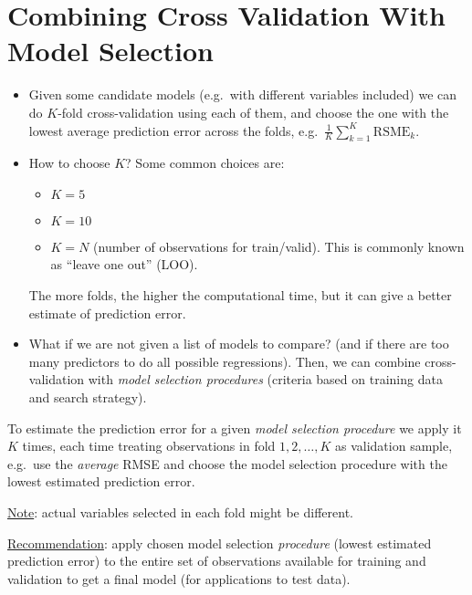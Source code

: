 \section{Combining Cross Validation With Model Selection}
\begin{itemize}
      \item Given some candidate models (e.g.\ with different
            variables included) we can do $ K $-fold
            cross-validation using each of them, and choose the one
            with the lowest average prediction error across
            the folds, e.g.\ $ \displaystyle
                  \frac{1}{K} \sum_{k=1}^{K} \text{RSME}_k $.
      \item How to choose $ K $? Some common choices are:
            \begin{itemize}
                  \item $ K=5 $
                  \item $ K=10 $
                  \item $ K=N $ (number of observations for train/valid).
                        This is commonly known as ``leave one out'' (LOO).
            \end{itemize}
            The more folds, the higher the computational time, but
            it can give a better estimate of prediction error.
      \item What if we are not given a list of models to compare?
            (and if there are too many predictors to do all possible
            regressions). Then, we can combine cross-validation with
            \emph{model selection procedures} (criteria based on training
            data and search strategy).
\end{itemize}
To estimate the prediction error for a given
\emph{model selection procedure} we apply it $ K $ times,
each time treating observations in fold $ 1,2,\ldots,K $
as validation sample, e.g.\ use the \emph{average}
RMSE and choose the model selection procedure
with the lowest estimated prediction error.

\underline{Note}: actual variables selected in each fold might
be different.

\underline{Recommendation}: apply chosen
model selection \emph{procedure} (lowest estimated prediction error)
to the entire set of observations available for training
and validation to get a final model (for applications
to test data).

